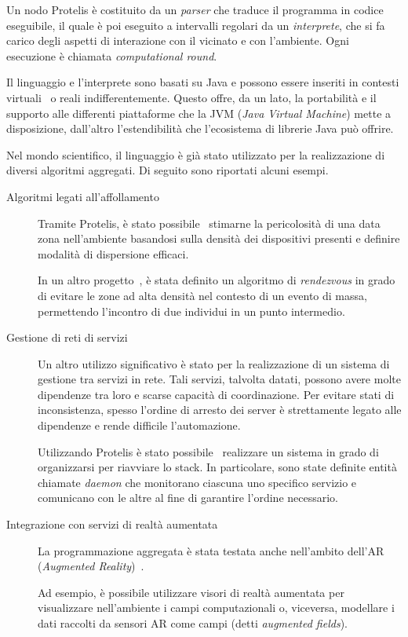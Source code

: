 %   

Un nodo Protelis è costituito da un \emph{parser} che traduce il programma in codice eseguibile, il quale è poi eseguito a intervalli regolari da un \emph{interprete}, che si fa carico degli aspetti di interazione con il vicinato e con l'ambiente.
Ogni esecuzione è chiamata \emph{computational round}.

Il linguaggio e l'interprete sono basati su Java e possono essere inseriti in contesti virtuali~\cite{ProtelisSAC14} o reali indifferentemente.
Questo offre, da un lato, la portabilità e il supporto alle differenti piattaforme che la JVM (\emph{Java Virtual Machine}) mette a disposizione, dall'altro l'estendibilità che l'ecosistema di librerie Java può offrire.

Nel mondo scientifico, il linguaggio è già stato utilizzato per la realizzazione di diversi algoritmi aggregati.
Di seguito sono riportati alcuni esempi.

\begin{description}
  \item[Algoritmi legati all'affollamento]
    Tramite Protelis, è stato possibile~\cite{BV-FOCAS2014} stimarne la pericolosità di una data zona nell'ambiente basandosi sulla densità dei dispositivi presenti e definire modalità di dispersione efficaci.

    In un altro progetto~\cite{ProtelisSAC14}, è stata definito un algoritmo di \emph{rendezvous} in grado di evitare le zone ad alta densità nel contesto di un evento di massa, permettendo l'incontro di due individui in un punto intermedio.

  \item[Gestione di reti di servizi]
    Un altro utilizzo significativo è stato per la realizzazione di un sistema di gestione tra servizi in rete.
    Tali servizi, talvolta datati, possono avere molte dipendenze tra loro e scarse capacità di coordinazione.
    Per evitare stati di inconsistenza, spesso l'ordine di arresto dei server è strettamente legato alle dipendenze e rende difficile l'automazione.

    Utilizzando Protelis è stato possibile~\cite{7306601} realizzare un sistema in grado di organizzarsi per riavviare lo stack.
    In particolare, sono state definite entità chiamate \emph{daemon} che monitorano ciascuna uno specifico servizio e comunicano con le altre al fine di garantire l'ordine necessario.

  \item[Integrazione con servizi di realtà aumentata]
    La programmazione aggregata è stata testata anche nell'ambito dell'AR (\emph{Augmented Reality})~\cite{PCRV-SCOPES2015}.

    Ad esempio, è possibile utilizzare visori di realtà aumentata per visualizzare nell'ambiente i campi computazionali
    o, viceversa, modellare i dati raccolti da sensori AR come campi (detti \emph{augmented fields}).
\end{description}

